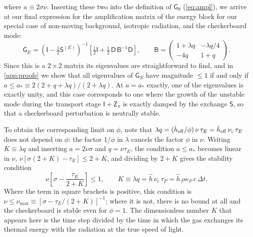 \documentclass[preprint,12pt,authoryear]{elsarticle}
\newcommand{\tenS}{\mathsf{S}}
\newcommand{\tenI}{\mathsf{I}}
\newcommand{\tenG}{\mathsf{G}}
\newcommand{\tenZ}{\mathsf{Z}}
\providecommand{\tenD}{\mathsf{D}}
\providecommand{\tenB}{\mathsf{B}}
\begin{document}
where $a \equiv 2\sigma\nu$. Inserting these two into the definition of $\tenG_\theta$ (\autoref{eq:ampl}), we arrive at our final expression for the amplification matrix of the energy block for our special case of non-moving background, isotropic radiation, and the checkerboard mode:
\begin{equation}
    \tenG_E = \left(\tenI - \tfrac{1}{2}\tenS^{(E)}\right)^{-1}\left[\tfrac{1}{2}\tenI + \tfrac{1}{2}\,\tenD\,\tenB^{-1}\tenD\right],
    \qquad
    \tenB = \left(\begin{array}{cc} 1 + \lambda q & -\lambda q/4 \\ -4q & 1 + q \end{array}\right).
    \label{eq:G_energy}
\end{equation}
Since this is a $2\times 2$ matrix its eigenvalues are straightforward to find, and in \ref{app:proofs} we show that all eigenvalues of $\tenG_E$ have magnitude $\leq 1$ if and only if $a \leq a_* \equiv 2(2 + q + \lambda q)/(2 + \lambda q)$. At $a=a_*$ exactly, one of the eigenvalues is exactly unity, and this case corresponds to one where the growth of the unstable mode during the transport stage $\tenI + \tenZ_\pi$ is exactly damped by the exchange $\tenS$, so that a checkerboard perturbation is neutrally stable.

To obtain the corresponding limit on $\phi$, note that $\lambda q = (\hat{h}_{\rm eff}/\phi)\,\nu\,\tau_E = \hat{h}_{\rm eff}\,\nu_c\,\tau_E$ does not depend on $\phi$: the factor $1/\phi$ in $\lambda$ cancels the factor $\phi$ in $\nu$. Writing $K \equiv \lambda q$ and inserting $a = 2\nu\sigma$ and $q = \nu\tau_E$, the condition $a \leq a_*$ becomes linear in $\nu$, $\nu[\sigma(2 + K) - \tau_E] \leq 2 + K$, and dividing by $2 + K$ gives the stability condition
\begin{equation}
    \nu\left[\sigma - \frac{\tau_E}{2 + K}\right] \leq 1,
    \qquad
    K \equiv \lambda q = \hat{h}\,\nu_c\,\tau_P = \hat{h}\,\rho\kappa_P\, c\,\Delta t .
    \label{eq:numax}
\end{equation}
Where the term in square brackets is positive, this condition is $\nu \leq \nu_{\max} \equiv [\sigma - \tau_E/(2 + K)]^{-1}$; where it is not, there is no bound at all and the checkerboard is stable even for $\phi = 1$. The dimensionless number $K$ that appears here is the time step divided by the time in which the gas exchanges its thermal energy with the radiation at the true speed of light.
\end{document}
